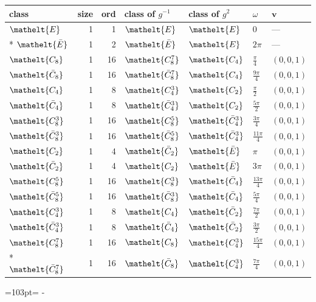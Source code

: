 \documentclass[10pt,a4paper]{article}
\newcommand{\needspace}[1]{\par\penalty-100\begingroup\dimen0=#1\relax\dimen2=\pagegoal
  \advance\dimen2-\pagetotal\ifdim\dimen0>\dimen2\relax\ifdim\dimen2>0pt\vfil\break\fi\fi
  \endgroup}
\numberwithin{equation}{section}
\newcommand{\eltfont}[1]{{\let\sigma\eltsigma\mathelt{#1}}}
\newcommand{\cls}[1]{\eltfont{#1}}
\newcommand{\dirvec}[3]{(#1, #2, #3)}
\newcommand{\vv}{\mathbf{v}}
\newcommand{\barred}[1]{\bar{#1}}
\begin{document}
{\renewcommand{\arraystretch}{1.3}\begin{longtable}{@{}lrrllll@{}}\toprule
class & size & ord & class of $g^{-1}$ & class of $g^{2}$ & $\omega$ & $\vv$\\\midrule\endhead
\bottomrule\endfoot\endlastfoot
$\cls{E}$ & 1 & 1 & $\cls{E}$ & $\cls{E}$ & $0$ & ---\\*
$\cls{\barred{E}}$ & 1 & 2 & $\cls{\barred{E}}$ & $\cls{E}$ & $2\pi$ & ---\\
$\cls{C_{8}}$ & 1 & 16 & $\cls{C_{8}^{7}}$ & $\cls{C_{4}}$ & $\tfrac{\pi}{4}$ & $\dirvec{0}{0}{1}$\\
$\cls{\barred{C}_{8}}$ & 1 & 16 & $\cls{\barred{C}_{8}^{7}}$ & $\cls{C_{4}}$ & $\tfrac{9\pi}{4}$ & $\dirvec{0}{0}{1}$\\
$\cls{C_{4}}$ & 1 & 8 & $\cls{C_{4}^{3}}$ & $\cls{C_{2}}$ & $\tfrac{\pi}{2}$ & $\dirvec{0}{0}{1}$\\
$\cls{\barred{C}_{4}}$ & 1 & 8 & $\cls{\barred{C}_{4}^{3}}$ & $\cls{C_{2}}$ & $\tfrac{5\pi}{2}$ & $\dirvec{0}{0}{1}$\\
$\cls{C_{8}^{3}}$ & 1 & 16 & $\cls{C_{8}^{5}}$ & $\cls{\barred{C}_{4}^{3}}$ & $\tfrac{3\pi}{4}$ & $\dirvec{0}{0}{1}$\\
$\cls{\barred{C}_{8}^{3}}$ & 1 & 16 & $\cls{\barred{C}_{8}^{5}}$ & $\cls{\barred{C}_{4}^{3}}$ & $\tfrac{11\pi}{4}$ & $\dirvec{0}{0}{1}$\\
$\cls{C_{2}}$ & 1 & 4 & $\cls{\barred{C}_{2}}$ & $\cls{\barred{E}}$ & $\pi$ & $\dirvec{0}{0}{1}$\\
$\cls{\barred{C}_{2}}$ & 1 & 4 & $\cls{C_{2}}$ & $\cls{\barred{E}}$ & $3\pi$ & $\dirvec{0}{0}{1}$\\
$\cls{C_{8}^{5}}$ & 1 & 16 & $\cls{C_{8}^{3}}$ & $\cls{\barred{C}_{4}}$ & $\tfrac{13\pi}{4}$ & $\dirvec{0}{0}{1}$\\
$\cls{\barred{C}_{8}^{5}}$ & 1 & 16 & $\cls{\barred{C}_{8}^{3}}$ & $\cls{\barred{C}_{4}}$ & $\tfrac{5\pi}{4}$ & $\dirvec{0}{0}{1}$\\
$\cls{C_{4}^{3}}$ & 1 & 8 & $\cls{C_{4}}$ & $\cls{\barred{C}_{2}}$ & $\tfrac{7\pi}{2}$ & $\dirvec{0}{0}{1}$\\
$\cls{\barred{C}_{4}^{3}}$ & 1 & 8 & $\cls{\barred{C}_{4}}$ & $\cls{\barred{C}_{2}}$ & $\tfrac{3\pi}{2}$ & $\dirvec{0}{0}{1}$\\
$\cls{C_{8}^{7}}$ & 1 & 16 & $\cls{C_{8}}$ & $\cls{C_{4}^{3}}$ & $\tfrac{15\pi}{4}$ & $\dirvec{0}{0}{1}$\\*
$\cls{\barred{C}_{8}^{7}}$ & 1 & 16 & $\cls{\barred{C}_{8}}$ & $\cls{C_{4}^{3}}$ & $\tfrac{7\pi}{4}$ & $\dirvec{0}{0}{1}$\\
\bottomrule\end{longtable}}
\needspace{103pt}
\end{document}
